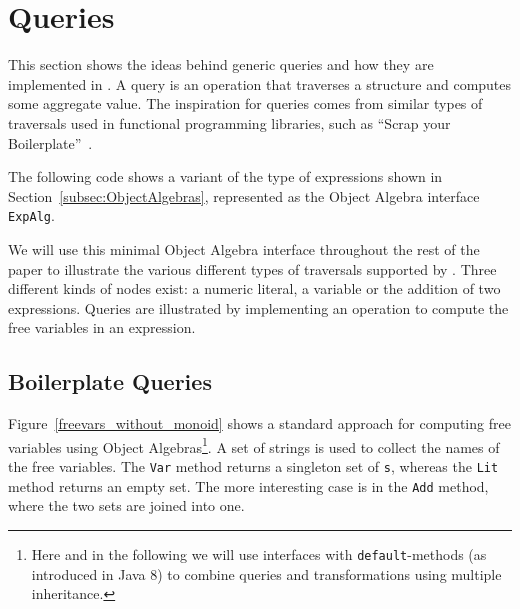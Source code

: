 \section{Queries}\label{sec:queries}

This section shows the ideas behind generic queries and how they are
implemented in \Name.  A query is an operation that traverses a
structure and computes some aggregate value. The inspiration for
queries comes from similar types of traversals used in functional
programming libraries, such as ``Scrap your
Boilerplate''~\cite{ralf03syb}.



The following code shows a variant of the type of expressions shown in
Section~\ref{subsec:ObjectAlgebras},
represented as the Object Algebra interface \lstinline{ExpAlg}.


\noindent We will use this
minimal Object Algebra interface throughout the rest of the paper to
illustrate the various different types of traversals supported by
\Name.  Three different kinds of nodes exist: a numeric literal, a
variable or the addition of two expressions. Queries are illustrated
by implementing an operation to compute the free variables in an expression.

\begin{comment}
As a specific type of Object Algebras, queries allow users to define
new operations handling a user-defined data structure\bruno{This
  definition of queries is just too broad. Please
look at papers like Syb to see how they describe queries and transformations}. A \textit{query
  algebra} is a class implementing an Object Algebra interface by a
top-down traversal throughout the hierarchy. It is something
supporting the program to gather information from the substructures of
a data type recursively, and make a response at the root node to the
query.
\end{comment}

\subsection{Boilerplate Queries}\label{subsec:freevars}

Figure~\ref{freevars_without_monoid} shows a
standard approach for computing free variables using Object Algebras\footnote{Here and in the following we will use interfaces with \lstinline{default}-methods (as introduced in Java 8) to combine queries and transformations using multiple inheritance.}.
A set of strings is used to collect the names of the free variables. The
\lstinline{Var} method returns a singleton set of \lstinline{s},
whereas the \lstinline{Lit} method returns an empty set. The
more interesting case is in the \lstinline{Add} method, where the two
sets are joined into one.


